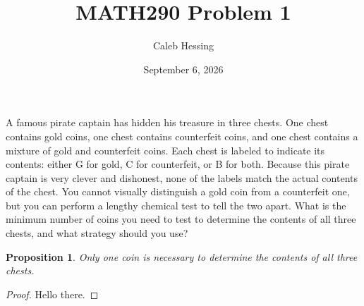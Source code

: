 \documentclass{article}
\title{MATH290 Problem 1}
\author{Caleb Hessing}
\date{September 6, 2026}
\newtheorem{proposition}{Proposition}
\begin{document}
\maketitle 

A famous pirate captain has hidden his treasure in three chests. One chest contains
gold coins, one chest contains counterfeit coins, and one chest contains a mixture of
gold and counterfeit coins. Each chest is labeled to indicate its contents: either G
for gold, C for counterfeit, or B for both. Because this pirate captain is very clever
and dishonest, none of the labels match the actual contents of the chest. You cannot
visually distinguish a gold coin from a counterfeit one, but you can perform a lengthy
chemical test to tell the two apart. What is the minimum number of coins you need to
test to determine the contents of all three chests, and what strategy should you use?

\begin{proposition}
    Only one coin is necessary to determine the contents of all three chests.
\end{proposition}

\begin{proof}
Hello there.

\end{proof}
\end{document}
